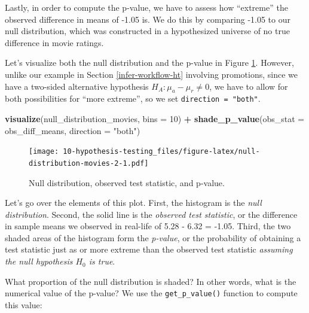 \documentclass[
]{book}
\newenvironment{Shaded}{\begin{snugshade}}{\end{snugshade}}
\newcommand{\DataTypeTok}[1]{\textcolor[rgb]{0.13,0.29,0.53}{#1}}
\newcommand{\DecValTok}[1]{\textcolor[rgb]{0.00,0.00,0.81}{#1}}
\newcommand{\KeywordTok}[1]{\textcolor[rgb]{0.13,0.29,0.53}{\textbf{#1}}}
\newcommand{\NormalTok}[1]{#1}
\newcommand{\OperatorTok}[1]{\textcolor[rgb]{0.81,0.36,0.00}{\textbf{#1}}}
\newcommand{\StringTok}[1]{\textcolor[rgb]{0.31,0.60,0.02}{#1}}
\begin{document}
Lastly, in order to compute the p-value, we have to assess how ``extreme'' the observed difference in means of -1.05 is. We do this by comparing -1.05 to our null distribution, which was constructed in a hypothesized universe of no true difference in movie ratings.

Let's visualize both the null distribution and the p-value in Figure \ref{fig:null-distribution-movies-2}. However, unlike our example in Section \ref{infer-workflow-ht} involving promotions, since we have a two-sided alternative hypothesis \(H_A: \mu_a - \mu_r \neq 0\), we have to allow for both possibilities for ``more extreme'', so we set \texttt{direction\ =\ "both"}.

\begin{Shaded}
\begin{Highlighting}[]
\KeywordTok{visualize}\NormalTok{(null_distribution_movies, }\DataTypeTok{bins =} \DecValTok{10}\NormalTok{) }\OperatorTok{+}\StringTok{ }
\StringTok{  }\KeywordTok{shade_p_value}\NormalTok{(}\DataTypeTok{obs_stat =}\NormalTok{ obs_diff_means, }\DataTypeTok{direction =} \StringTok{"both"}\NormalTok{)}
\end{Highlighting}
\end{Shaded}

\begin{figure}
\centering
\texttt{[image: 10-hypothesis-testing\_files/figure-latex/null-distribution-movies-2-1.pdf]}
\caption{\label{fig:null-distribution-movies-2}Null distribution, observed test statistic, and p-value.}
\end{figure}

Let's go over the elements of this plot. First, the histogram is the \emph{null distribution}. Second, the solid line is the \emph{observed test statistic}, or the difference in sample means we observed in real-life of 5.28 - 6.32 = -1.05. Third, the two shaded areas of the histogram form the \emph{p-value}, or the probability of obtaining a test statistic just as or more extreme than the observed test statistic \emph{assuming the null hypothesis \(H_0\) is true}.

What proportion of the null distribution is shaded? In other words, what is the numerical value of the p-value? We use the \texttt{get\_p\_value()} function to compute this value:

\begin{Shaded}
\end{Shaded}
\end{document}
